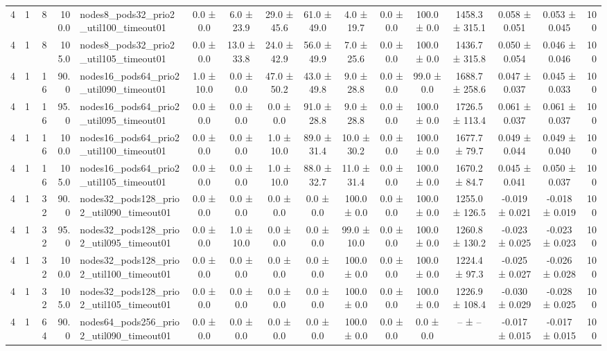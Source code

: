 \begin{tabular}{r r r r l c c c c c c c c c c r}
4 & 1 & 8 & 100.0 & nodes8\_pods32\_prio2\_util100\_timeout01 & 0.0 ± 0.0 & 6.0 ± 23.9 & 29.0 ± 45.6 & 61.0 ± 49.0 & 4.0 ± 19.7 & 0.0 ± 0.0 & 100.0 ± 0.0 & 1458.3 ± 315.1 & 0.058 ± 0.051 & 0.053 ± 0.045 & 100 \\
4 & 1 & 8 & 105.0 & nodes8\_pods32\_prio2\_util105\_timeout01 & 0.0 ± 0.0 & 13.0 ± 33.8 & 24.0 ± 42.9 & 56.0 ± 49.9 & 7.0 ± 25.6 & 0.0 ± 0.0 & 100.0 ± 0.0 & 1436.7 ± 315.8 & 0.050 ± 0.054 & 0.046 ± 0.046 & 100 \\
4 & 1 & 16 & 90.0 & nodes16\_pods64\_prio2\_util090\_timeout01 & 1.0 ± 10.0 & 0.0 ± 0.0 & 47.0 ± 50.2 & 43.0 ± 49.8 & 9.0 ± 28.8 & 0.0 ± 0.0 & 99.0 ± 0.0 & 1688.7 ± 258.6 & 0.047 ± 0.037 & 0.045 ± 0.033 & 100 \\
4 & 1 & 16 & 95.0 & nodes16\_pods64\_prio2\_util095\_timeout01 & 0.0 ± 0.0 & 0.0 ± 0.0 & 0.0 ± 0.0 & 91.0 ± 28.8 & 9.0 ± 28.8 & 0.0 ± 0.0 & 100.0 ± 0.0 & 1726.5 ± 113.4 & 0.061 ± 0.037 & 0.061 ± 0.037 & 100 \\
4 & 1 & 16 & 100.0 & nodes16\_pods64\_prio2\_util100\_timeout01 & 0.0 ± 0.0 & 0.0 ± 0.0 & 1.0 ± 10.0 & 89.0 ± 31.4 & 10.0 ± 30.2 & 0.0 ± 0.0 & 100.0 ± 0.0 & 1677.7 ± 79.7 & 0.049 ± 0.044 & 0.049 ± 0.040 & 100 \\
4 & 1 & 16 & 105.0 & nodes16\_pods64\_prio2\_util105\_timeout01 & 0.0 ± 0.0 & 0.0 ± 0.0 & 1.0 ± 10.0 & 88.0 ± 32.7 & 11.0 ± 31.4 & 0.0 ± 0.0 & 100.0 ± 0.0 & 1670.2 ± 84.7 & 0.045 ± 0.041 & 0.050 ± 0.037 & 100 \\
4 & 1 & 32 & 90.0 & nodes32\_pods128\_prio2\_util090\_timeout01 & 0.0 ± 0.0 & 0.0 ± 0.0 & 0.0 ± 0.0 & 0.0 ± 0.0 & 100.0 ± 0.0 & 0.0 ± 0.0 & 100.0 ± 0.0 & 1255.0 ± 126.5 & -0.019 ± 0.021 & -0.018 ± 0.019 & 100 \\
4 & 1 & 32 & 95.0 & nodes32\_pods128\_prio2\_util095\_timeout01 & 0.0 ± 0.0 & 1.0 ± 10.0 & 0.0 ± 0.0 & 0.0 ± 0.0 & 99.0 ± 10.0 & 0.0 ± 0.0 & 100.0 ± 0.0 & 1260.8 ± 130.2 & -0.023 ± 0.025 & -0.023 ± 0.023 & 100 \\
4 & 1 & 32 & 100.0 & nodes32\_pods128\_prio2\_util100\_timeout01 & 0.0 ± 0.0 & 0.0 ± 0.0 & 0.0 ± 0.0 & 0.0 ± 0.0 & 100.0 ± 0.0 & 0.0 ± 0.0 & 100.0 ± 0.0 & 1224.4 ± 97.3 & -0.025 ± 0.027 & -0.026 ± 0.028 & 100 \\
4 & 1 & 32 & 105.0 & nodes32\_pods128\_prio2\_util105\_timeout01 & 0.0 ± 0.0 & 0.0 ± 0.0 & 0.0 ± 0.0 & 0.0 ± 0.0 & 100.0 ± 0.0 & 0.0 ± 0.0 & 100.0 ± 0.0 & 1226.9 ± 108.4 & -0.030 ± 0.029 & -0.028 ± 0.025 & 100 \\
4 & 1 & 64 & 90.0 & nodes64\_pods256\_prio2\_util090\_timeout01 & 0.0 ± 0.0 & 0.0 ± 0.0 & 0.0 ± 0.0 & 0.0 ± 0.0 & 100.0 ± 0.0 & 0.0 ± 0.0 & 0.0 ± 0.0 & -- ± -- & -0.017 ± 0.015 & -0.017 ± 0.015 & 100 \\

\end{tabular}
